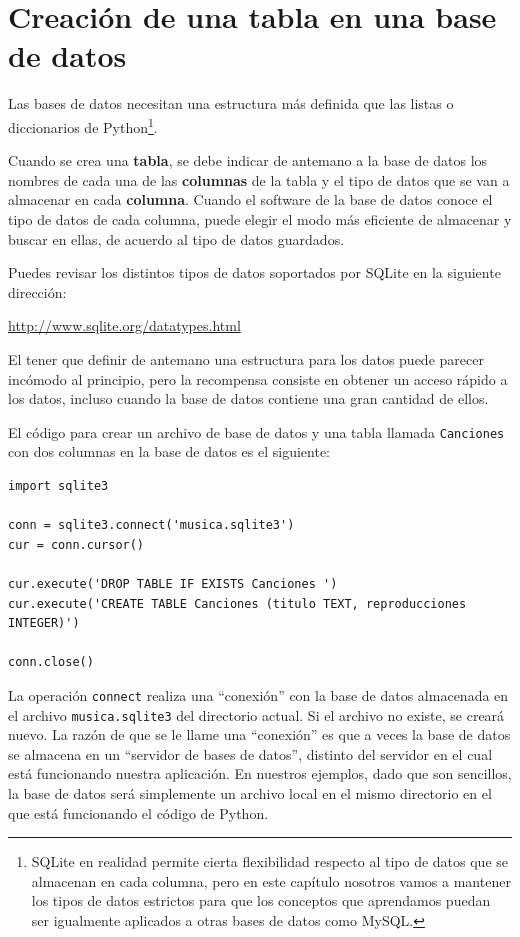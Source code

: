 \section{Creación de una tabla en una base de datos}

Las bases de datos necesitan una estructura más definida que las listas
o diccionarios de Python\footnote{SQLite en realidad permite cierta
flexibilidad respecto al tipo de datos que se almacenan en cada columna,
pero en este capítulo nosotros vamos a mantener los tipos de datos estrictos
para que los conceptos que aprendamos puedan ser igualmente aplicados a otras
bases de datos como MySQL.}.

Cuando se crea una {\bf tabla}, se debe
indicar de antemano a la base de datos los nombres de cada una de las
{\bf columnas} de la tabla y el tipo de datos que se van a
almacenar en cada {\bf columna}. Cuando el software de la base de datos
conoce el tipo de datos de cada columna, puede elegir el modo más
eficiente de almacenar y buscar en ellas, de acuerdo al tipo de
datos guardados.

Puedes revisar los distintos tipos de datos soportados por SQLite
en la siguiente dirección:

\url{http://www.sqlite.org/datatypes.html}

El tener que definir de antemano una estructura para los datos puede parecer incómodo
al principio, pero la recompensa consiste en obtener un acceso rápido a los datos,
incluso cuando la base de datos contiene una gran cantidad de ellos.

El código para crear un archivo de base de datos y una tabla
llamada {\tt Canciones} con dos columnas en la
base de datos es el siguiente:

\beforeverb
\begin{verbatim}
import sqlite3

conn = sqlite3.connect('musica.sqlite3')
cur = conn.cursor()

cur.execute('DROP TABLE IF EXISTS Canciones ')
cur.execute('CREATE TABLE Canciones (titulo TEXT, reproducciones INTEGER)')

conn.close()
\end{verbatim}
\afterverb
%
La operación {\tt connect} realiza una ``conexión'' con la base de datos
almacenada en el archivo {\tt musica.sqlite3} del directorio actual. Si
el archivo no existe, se creará nuevo. La razón de que se le
llame una ``conexión'' es que a veces la base de datos se almacena en
un ``servidor de bases de datos'', distinto del servidor en el cual está
funcionando nuestra aplicación. En nuestros ejemplos, dado que son sencillos,
la base de datos será simplemente un archivo local en el mismo directorio
en el que está funcionando el código de Python.

